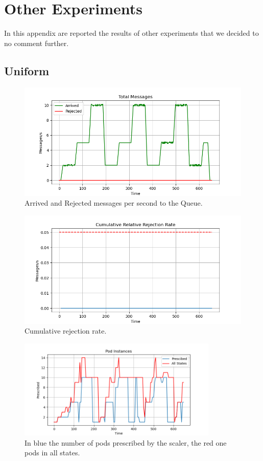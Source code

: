\section{Other Experiments}
\label{sec:other_experiments}
In this appendix are reported the results of other experiments that we decided to no comment further.
\subsection{Uniform}
\begin{figure}[H]
    \centering
    \includegraphics[width=0.85\linewidth]{images/Uniform_Fast/messages.png}
    \caption{Arrived and Rejected messages per second to the Queue.}
    \label{fig:uniform_fast_messages}
\end{figure}
\begin{figure}[H]
    \centering
    \includegraphics[width=0.85\linewidth]{images/Uniform_Fast/rejectiob_cumulative.png}
    \caption{Cumulative rejection rate.}
    \label{fig:uniform_fast_rejection}
\end{figure}
\begin{figure}[H]
    \centering
    \includegraphics[width=0.85\textwidth]{images/Uniform_Fast/pods.png}
    \caption{In blue the number of pods prescribed by the scaler, the red one pods in all states.}
    \label{fig:uniform_fast_pods}
\end{figure}

